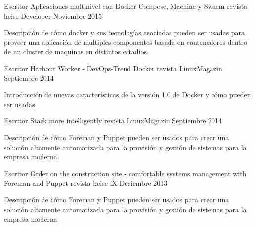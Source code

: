 {}


\begin{cventries}

  \cventry
  {Escritor} %
    {Aplicaciones multinivel con Docker Compose, Machine y Swarm}
    {revista heise Developer} %
    {Noviembre 2015} %
    {
      \begin{cvitems} %
      \item {Descripción de cómo docker y sus tecnologías asociadas pueden ser usadas para proveer una aplicación de multiples componentes basada en contenedores dentro de un cluster de maquinas en distintos estadios.}
      \end{cvitems}
    }

  \cventry
  {Escritor} %
    {Harbour Worker - DevOps-Trend Docker} %
    {revista LinuxMagazin} %
    {Septiembre 2014} %
    {
      \begin{cvitems} %
        \item {Introducción de nuevas características de la versión 1.0 de Docker y cómo pueden ser usadas}
      \end{cvitems}
    }
  \cventry
  {Escritor} %
    {Stack more intelligently} %
    {revista LinuxMagazin} %
    {Septiembre 2014} %
    {
      \begin{cvitems} %
        \item {Descripción de cómo Foreman y Puppet pueden ser usados para crear una solución altamente automatizada para la provisión y gestión de sistemas para la empresa moderna.}
      \end{cvitems}
    }
  \cventry
  {Escritor} %
    {Order on the construction site - comfortable systems management with Foreman and Puppet} %
    {revista heise iX} %
    {Deciembre 2013} %
    {
      \begin{cvitems} %
        \item {Descripción de cómo Foreman y Puppet pueden ser usados para crear una solución altamente automatizada para la provisión y gestión de sistemas para la empresa moderna}
      \end{cvitems}
    }

\end{cventries}
